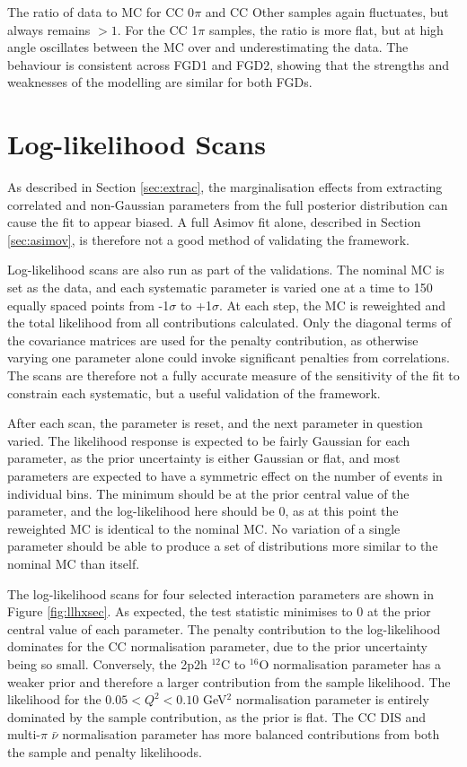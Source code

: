 The ratio of data to MC for CC 0$\pi$ and CC Other samples again fluctuates, but always remains $>1$. For the CC 1$\pi$ samples, the ratio is more flat, but at high angle oscillates between the MC over and underestimating the data. The behaviour is consistent across FGD1 and FGD2, showing that the strengths and weaknesses of the modelling are similar for both FGDs.

\FloatBarrier
\section{Log-likelihood Scans}\label{sec:llhscan}

As described in Section \ref{sec:extrac}, the marginalisation effects from extracting correlated and non-Gaussian parameters from the full posterior distribution can cause the fit to appear biased. A full Asimov fit alone, described in Section \ref{sec:asimov}, is therefore not a good method of validating the framework.

Log-likelihood scans are also run as part of the validations. The nominal MC is set as the data, and each systematic parameter is varied one at a time to 150 equally spaced points from -1$\sigma$ to +1$\sigma$. At each step, the MC is reweighted and the total likelihood from all contributions calculated. Only the diagonal terms of the covariance matrices are used for the penalty contribution, as otherwise varying one parameter alone could invoke significant penalties from correlations. The scans are therefore not a fully accurate measure of the sensitivity of the fit to constrain each systematic, but a useful validation of the framework.

After each scan, the parameter is reset, and the next parameter in question varied. The likelihood response is expected to be fairly Gaussian for each parameter, as the prior uncertainty is either Gaussian or flat, and most parameters are expected to have a symmetric effect on the number of events in individual bins. The minimum should be at the prior central value of the parameter, and the log-likelihood here should be 0, as at this point the reweighted MC is identical to the nominal MC. No variation of a single parameter should be able to produce a set of distributions more similar to the nominal MC than itself.

The log-likelihood scans for four selected interaction parameters are shown in Figure \ref{fig:llhxsec}. As expected, the test statistic minimises to 0 at the prior central value of each parameter. The penalty contribution to the log-likelihood dominates for the CC normalisation parameter, due to the prior uncertainty being so small. Conversely, the 2p2h $^{12}$C to $^{16}$O normalisation parameter has a weaker prior and therefore a larger contribution from the sample likelihood. The likelihood for the $0.05 < Q^2 < 0.10$ GeV$^2$ normalisation parameter is entirely dominated by the sample contribution, as the prior is flat. The CC DIS and multi-$\pi$ $\bar{\nu}$ normalisation parameter has more balanced contributions from both the sample and penalty likelihoods.

